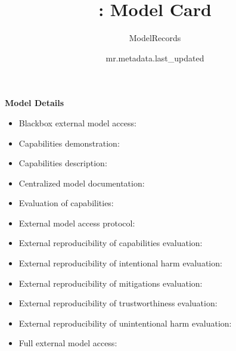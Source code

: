 \documentclass{article}
\title{\VAR{mr.metadata.name}: Model Card}
\author{ModelRecords}
\date{mr.metadata.last_updated}
\begin{document}
\newenvironment{mcsection}[1]
    {
        \textbf{#1}


        \begin{itemize}[leftmargin=*,topsep=0pt,itemsep=-1ex,partopsep=1ex,parsep=1ex,after=\vspace{\medskipamount}]
    }
    {
        \end{itemize}
    }

\begin{adjustwidth}{-60pt}{-30pt}
\begin{singlespace}

\begin{tcolorbox}[title=\textbf{\VAR{mr.metadata.name} : Model Card},
breakable, sharp corners, boxrule=0.7pt]

\begin{mcsection}{Model Details}
    \item Blackbox external model access: 
    \item Capabilities demonstration: 
    \item Capabilities description: 
    \item Centralized model documentation: 
    \item Evaluation of capabilities: 
    \item External model access protocol: 
    \item External reproducibility of capabilities evaluation: 
    \item External reproducibility of intentional harm evaluation: 
    \item External reproducibility of mitigations evaluation: 
    \item External reproducibility of trustworthiness evaluation: 
    \item External reproducibility of unintentional harm evaluation: 
    \item Full external model access: 

\end{mcsection}
\end{tcolorbox}
\end{singlespace}
\end{adjustwidth}
\end{document}
